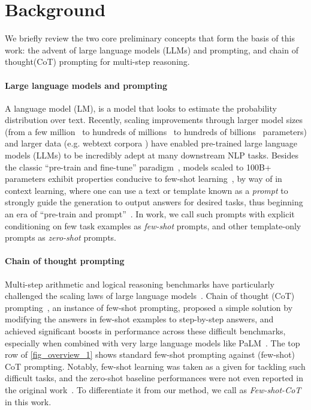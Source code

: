 \documentclass{article}
\newcommand{\CoT}{chain of thought\xspace}
\newcommand{\theirs}{Few-shot-CoT\xspace}
\begin{document}
\section{Background}   
We briefly review the two core preliminary concepts that form the basis of this work: the advent of large language models (LLMs) and prompting, and \CoT (CoT) prompting for multi-step reasoning.

\paragraph{Large language models and prompting}
A language model (LM), is a model that looks to estimate the probability distribution over text. Recently, scaling improvements through larger model sizes (from a few million~\citep{merity2016pointer} to hundreds of millions~\citep{bert} to hundreds of billions~\citep{brown2020language} parameters) and larger data (e.g. webtext corpora \citep{gao2020pile}) have enabled pre-trained large language models (LLMs) to be incredibly adept at many downstream NLP tasks. Besides the classic ``pre-train and fine-tune'' paradigm~\citep{liu2021pre}, models scaled to 100B+ parameters exhibit properties conducive to few-shot learning~\citep{brown2020language}, by way of in context learning, where one can use a text or template known as a \emph{prompt} to strongly guide the generation to output answers for desired tasks, thus beginning an era of ``pre-train and prompt''~\citep{liu2021makes}. In work, we call such prompts with explicit conditioning on few task examples as \textit{few-shot} prompts, and other template-only prompts as \textit{zero-shot} prompts. 

\paragraph{Chain of thought prompting}
Multi-step arithmetic and logical reasoning benchmarks have particularly challenged the scaling laws of large language models~\citep{gopher}. Chain of thought (CoT) prompting~\citep{cot_wei}, an instance of few-shot prompting, proposed a simple solution by modifying the answers in few-shot examples to step-by-step answers, and achieved significant boosts in performance across these difficult benchmarks, especially when combined with very large language models like PaLM~\citep{palm}. The top row of \autoref{fig_overview_1} shows standard few-shot prompting against (few-shot) CoT prompting. Notably, few-shot learning was taken as a given for tackling such difficult tasks, and the zero-shot baseline performances were not even reported in the original work~\citep{cot_wei}. To differentiate it from our method, we call \citet{cot_wei} as \textit{\theirs} in this work.   
\end{document}
